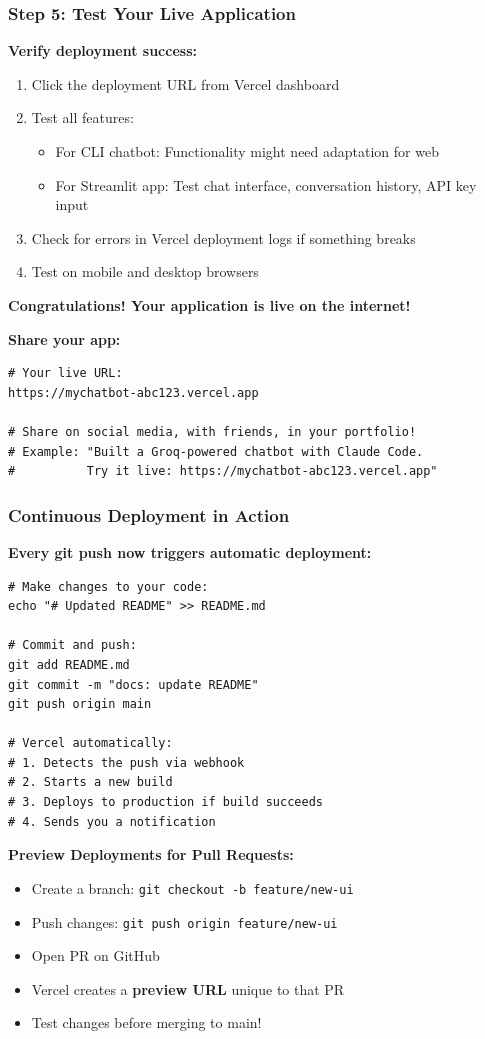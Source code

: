 \begin{frame}[fragile]\frametitle{Step 5: Test Your Live Application}
\textbf{Verify deployment success:}

  \begin{enumerate}
    \item Click the deployment URL from Vercel dashboard
    \item Test all features:
      \begin{itemize}
        \item For CLI chatbot: Functionality might need adaptation for web
        \item For Streamlit app: Test chat interface, conversation history, API key input
      \end{itemize}
    \item Check for errors in Vercel deployment logs if something breaks
    \item Test on mobile and desktop browsers
  \end{enumerate}

\textbf{Congratulations! Your application is live on the internet!}

\textbf{Share your app:}
\begin{lstlisting}
# Your live URL:
https://mychatbot-abc123.vercel.app

# Share on social media, with friends, in your portfolio!
# Example: "Built a Groq-powered chatbot with Claude Code.
#          Try it live: https://mychatbot-abc123.vercel.app"
\end{lstlisting}
\end{frame}


\begin{frame}[fragile]\frametitle{Continuous Deployment in Action}
\textbf{Every git push now triggers automatic deployment:}

\begin{lstlisting}
# Make changes to your code:
echo "# Updated README" >> README.md

# Commit and push:
git add README.md
git commit -m "docs: update README"
git push origin main

# Vercel automatically:
# 1. Detects the push via webhook
# 2. Starts a new build
# 3. Deploys to production if build succeeds
# 4. Sends you a notification
\end{lstlisting}

\textbf{Preview Deployments for Pull Requests:}
  \begin{itemize}
    \item Create a branch: \lstinline|git checkout -b feature/new-ui|
    \item Push changes: \lstinline|git push origin feature/new-ui|
    \item Open PR on GitHub
    \item Vercel creates a \textbf{preview URL} unique to that PR
    \item Test changes before merging to main!
  \end{itemize}
\end{frame}


